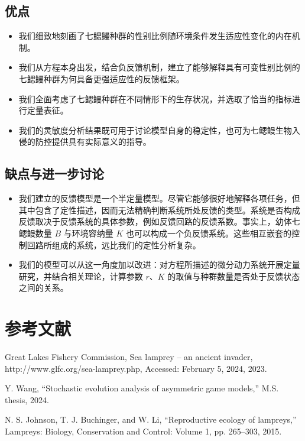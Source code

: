 \documentclass[11pt,a4paper]{ctexart}
\begin{document}
\subsection{优点}

\begin{itemize}
\item 我们细致地刻画了七鳃鳗种群的性别比例随环境条件发生适应性变化的内在机制。
\item 我们从方程本身出发，结合负反馈机制，建立了能够解释具有可变性别比例的七鳃鳗种群为何具备更强适应性的反馈框架。
\item 我们全面考虑了七鳃鳗种群在不同情形下的生存状况，并选取了恰当的指标进行定量表征。
\item 我们的灵敏度分析结果既可用于讨论模型自身的稳定性，也可为七鳃鳗生物入侵的防控提供具有实际意义的指导。
\end{itemize}

\subsection{缺点与进一步讨论}

\begin{itemize}
\item 我们建立的反馈模型是一个半定量模型。尽管它能够很好地解释各项任务，但其中包含了定性描述，因而无法精确判断系统所处反馈的类型。系统是否构成反馈取决于反馈系统的具体参数，例如反馈回路的反馈系数。事实上，幼体七鳃鳗数量 $B$ 与环境容纳量 $K$ 也可以构成一个负反馈系统。这些相互嵌套的控制回路所组成的系统，远比我们的定性分析复杂。
\item 我们的模型可以从这一角度加以改进：对方程所描述的微分动力系统开展定量研究，并结合相关理论，计算参数 $r$、$K$ 的取值与种群数量是否处于反馈状态之间的关系。
\end{itemize}

\section*{参考文献}

\noindent[1] Great Lakes Fishery Commission, Sea lamprey -- an ancient invader, http://www.glfc.org/sea-lamprey.php, Accessed: February 5, 2024, 2023.

\noindent[2] Y. Wang, ``Stochastic evolution analysis of asymmetric game models,'' M.S. thesis, 2024.

\noindent[3] N. S. Johnson, T. J. Buchinger, and W. Li, ``Reproductive ecology of lampreys,'' Lampreys: Biology, Conservation and Control: Volume 1, pp. 265--303, 2015.
\end{document}
